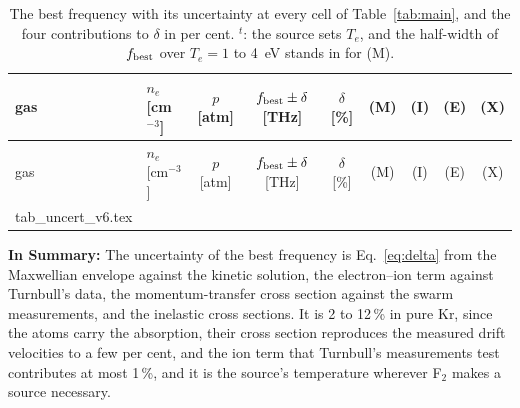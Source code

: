 \documentclass[11pt]{article}
\makeatletter
\numberwithin{equation}{section}
\newcommand{\tabinput}[1]{\@@input #1 }
\newcommand{\fbest}{f_{\rm best}}
\newcommand{\Te}{T_e}
\makeatother
\begin{document}
{\small
\setlength{\tabcolsep}{4pt}
\begin{longtable}{llccccccc}
\caption{The best frequency with its uncertainty at every cell of Table~\ref*{tab:main},
and the four contributions to $\delta$ in per cent. $^t$: the source sets $\Te$, and the
half-width of $\fbest$ over $\Te=1$ to 4~eV stands in for (M).}\label{tab:uncert}\\
\toprule
gas & $n_e$ [cm$^{-3}$] & $p$ [atm] & $\fbest\pm\delta$ [THz] & $\delta$ [\%] & (M) & (I) & (E) & (X)\\
\midrule
\endfirsthead
\toprule
gas & $n_e$ [cm$^{-3}$] & $p$ [atm] & $\fbest\pm\delta$ [THz] & $\delta$ [\%] & (M) & (I) & (E) & (X)\\
\midrule
\endhead
\bottomrule
\endfoot
\tabinput{tab_uncert_v6.tex}
\end{longtable}}

\medskip
\noindent\textbf{In Summary:} The uncertainty of the best frequency is
Eq.~\eqref{eq:delta} from the Maxwellian envelope against the kinetic solution, the
electron--ion term against Turnbull's data, the momentum-transfer cross section against the
swarm measurements, and the inelastic cross sections. It is 2 to 12\,\% in pure Kr, since the
atoms carry the absorption, their cross section reproduces the measured drift velocities to a
few per cent, and the ion term that Turnbull's measurements test contributes at most 1\,\%, and it is the source's temperature wherever F$_2$ makes a
source necessary.


\end{document}
